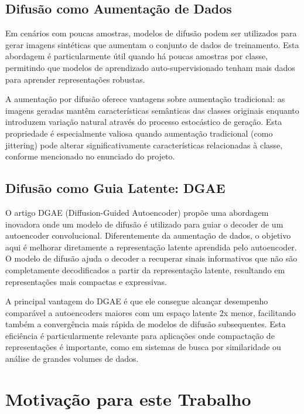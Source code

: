 \subsection{Difusão como Aumentação de Dados}

Em cenários com poucas amostras, modelos de difusão podem ser utilizados para gerar imagens sintéticas que aumentam o conjunto de dados de treinamento. Esta abordagem é particularmente útil quando há poucas amostras por classe, permitindo que modelos de aprendizado auto-supervisionado tenham mais dados para aprender representações robustas.

A aumentação por difusão oferece vantagens sobre aumentação tradicional: as imagens geradas mantêm características semânticas das classes originais enquanto introduzem variação natural através do processo estocástico de geração. Esta propriedade é especialmente valiosa quando aumentação tradicional (como jittering) pode alterar significativamente características relacionadas à classe, conforme mencionado no enunciado do projeto.

\subsection{Difusão como Guia Latente: DGAE}

O artigo DGAE (Diffusion-Guided Autoencoder) \cite{liu2025dgae} propõe uma abordagem inovadora onde um modelo de difusão é utilizado para guiar o decoder de um autoencoder convolucional. Diferentemente da aumentação de dados, o objetivo aqui é melhorar diretamente a representação latente aprendida pelo autoencoder. O modelo de difusão ajuda o decoder a recuperar sinais informativos que não são completamente decodificados a partir da representação latente, resultando em representações mais compactas e expressivas.

A principal vantagem do DGAE é que ele consegue alcançar desempenho comparável a autoencoders maiores com um espaço latente 2x menor, facilitando também a convergência mais rápida de modelos de difusão subsequentes. Esta eficiência é particularmente relevante para aplicações onde compactação de representações é importante, como em sistemas de busca por similaridade ou análise de grandes volumes de dados.

\section{Motivação para este Trabalho}

